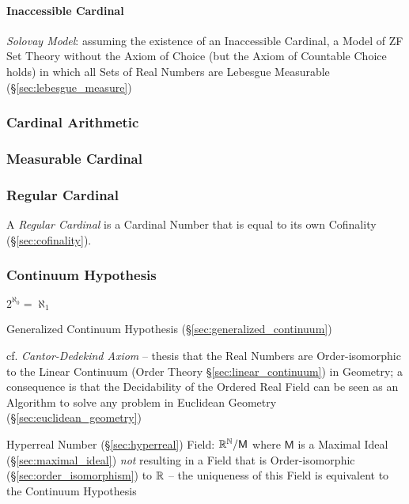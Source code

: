 \paragraph{Inaccessible Cardinal}\label{sec:inaccessible_cardinal}\hfill

\emph{Solovay Model}: assuming the existence of an Inaccessible Cardinal, a
Model of ZF Set Theory without the Axiom of Choice (but the Axiom of Countable
Choice holds) in which all Sets of Real Numbers are Lebesgue Measurable
(\S\ref{sec:lebesgue_measure})



\subsubsection{Cardinal Arithmetic}\label{sec:cardinal_arithmetic}

\subsubsection{Measurable Cardinal}\label{sec:measurable_cardinal}

\subsubsection{Regular Cardinal}\label{sec:regular_cardinal}

A \emph{Regular Cardinal} is a Cardinal Number that is equal to its
own Cofinality (\S\ref{sec:cofinality}).



\subsubsection{Continuum Hypothesis}\label{sec:continuum_hypothesis}

$2^{\aleph_0} = \aleph_1$

Generalized Continuum Hypothesis (\S\ref{sec:generalized_continuum})

cf. \emph{Cantor-Dedekind Axiom} -- thesis that the Real Numbers are
Order-isomorphic to the Linear Continuum (Order Theory
\S\ref{sec:linear_continuum}) in Geometry; a consequence is that the
Decidability of the Ordered Real Field can be seen as an Algorithm to solve any
problem in Euclidean Geometry (\S\ref{sec:euclidean_geometry})

Hyperreal Number (\S\ref{sec:hyperreal}) Field: $\mathbb{R}^{\mathbb{N}} /
\mathsf{M}$ where $\mathsf{M}$ is a Maximal Ideal
(\S\ref{sec:maximal_ideal}) \emph{not} resulting in a Field that is
Order-isomorphic (\S\ref{sec:order_isomorphism}) to $\mathbb{R}$ -- the
uniqueness of this Field is equivalent to the Continuum Hypothesis



